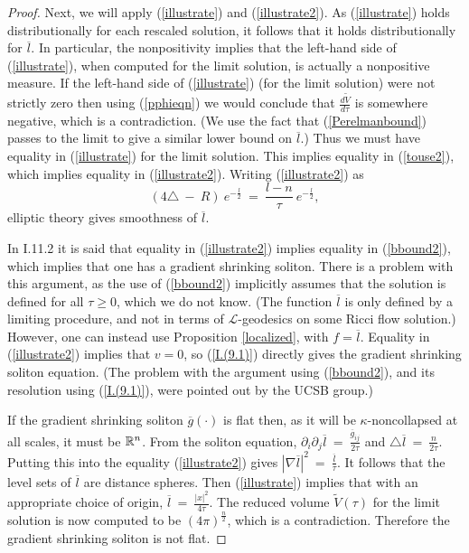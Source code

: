 \begin{proof}
Next, we will apply (\ref{illustrate}) and (\ref{illustrate2}).
As (\ref{illustrate}) holds distributionally
for each rescaled solution, it follows that
it holds distributionally for $\overline{l}$. In particular, the
nonpositivity implies that the left-hand side of (\ref{illustrate}), when
computed for the limit solution, is actually a nonpositive measure.
If the left-hand side of
(\ref{illustrate}) (for the limit solution)
were not strictly zero then using (\ref{pphieqn})  we would conclude
that $\frac{d\tilde{V}}{d\tau}$
is somewhere negative, which is a contradiction.
(We use the fact that (\ref{Perelmanbound}) passes to the limit
to give a similar lower bound on $\overline{l}$.)
Thus we must have equality in (\ref{illustrate}) for the limit solution.
This implies equality in (\ref{touse2}),
which implies equality in  (\ref{illustrate2}).
Writing
 (\ref{illustrate2}) as
\begin{equation}
(4 \triangle \: - \: R) \: e^{-\frac{l}{2}} \: = \:
\frac{l-n}{\tau} \: e^{-\frac{l}{2}},
\end{equation}
elliptic theory gives smoothness of $\overline{l}$.

In I.11.2 it is said that equality in  (\ref{illustrate2}) implies equality
in (\ref{bbound2}), which implies that one has a gradient shrinking soliton.
There is a problem with this argument, as the use of (\ref{bbound2})
implicitly
assumes that the solution is defined for all $\tau \ge 0$, which we do not
know. (The function $\overline{l}$ is only defined by a limiting
procedure, and not in terms of ${\mathcal L}$-geodesics on some
Ricci flow solution.) However, one can instead use Proposition \ref{localized}, with
$f = \overline{l}$.
Equality in (\ref{illustrate2}) implies that $v = 0$, so (\ref{I.(9.1)})
directly gives the gradient shrinking soliton equation.
(The problem with the argument using (\ref{bbound2}), and its resolution using
(\ref{I.(9.1)}), were pointed out by the UCSB group.)

If the gradient shrinking soliton $\overline{g}(\cdot)$ is
flat then, as it will be $\kappa$-noncollapsed
at all scales, it must be ${\mathbb R}^n$. From the soliton equation,
$\partial_i \partial_j \overline{l} \: = \:
\frac{\overline{g}_{ij}}{2\tau}$ and
$\triangle \overline{l} \: = \: \frac{n}{2\tau}$. Putting this
into the equality (\ref{illustrate2}) gives
$|\nabla \overline{l}|^2 \: = \: \frac{\overline{l}}{\tau}$.
It follows that the level sets of $\overline{l}$ are distance spheres.
Then (\ref{illustrate}) implies
that with an appropriate choice of
origin,
$\overline{l} \: = \: \frac{|x|^2}{4\tau}$.  The reduced volume
$\tilde{V}(\tau)$ for the limit solution is now computed to be
$(4 \pi)^{\frac{n}{2}}$, which is a contradiction.  Therefore the
gradient shrinking soliton is not flat.
\end{proof}

